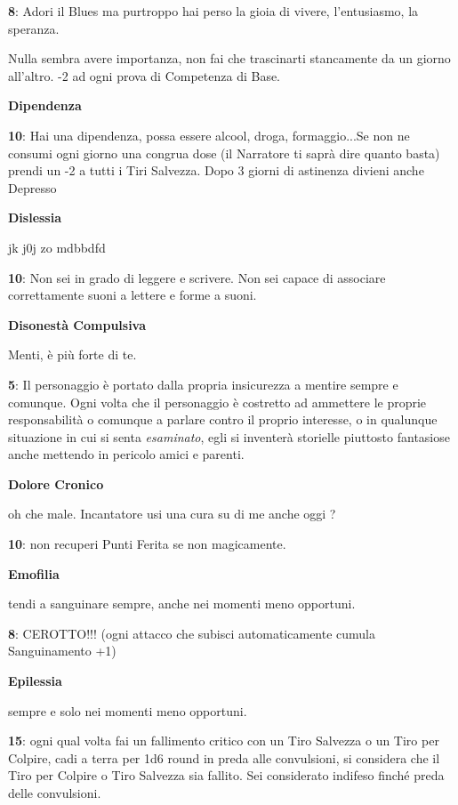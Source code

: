 \documentclass[a4paper,twoside,openany]{book}
\begin{document}
\begin{multicols}{2}
\textbf{8}: Adori il Blues ma purtroppo hai perso la gioia di vivere, l'entusiasmo, la speranza.

Nulla sembra avere importanza, non fai che trascinarti stancamente da un giorno all'altro. -2 ad ogni prova di Competenza di Base.

\textbf{Dipendenza}

\textbf{10}: Hai una dipendenza, possa essere alcool, droga, formaggio...Se non ne consumi ogni giorno una congrua dose (il Narratore ti saprà dire quanto basta) prendi un -2 a tutti i Tiri Salvezza. Dopo 3 giorni di astinenza divieni anche Depresso

\textbf{Dislessia}

jk j0j zo mdbbdfd

\textbf{10}: Non sei in grado di leggere e scrivere. Non sei capace di associare correttamente suoni a lettere e forme a suoni.

\textbf{Disonestà Compulsiva}

Menti, è più forte di te.

\textbf{5}: Il personaggio è portato dalla propria insicurezza a mentire sempre e comunque. Ogni volta che il personaggio è costretto ad ammettere le proprie responsabilità o comunque a parlare contro il proprio interesse, o in qualunque situazione in cui si senta \emph{esaminato}, egli si inventerà storielle piuttosto fantasiose anche mettendo in pericolo amici e parenti.

\textbf{Dolore Cronico}

oh che male. Incantatore usi una cura su di me anche oggi ?

\textbf{10}: non recuperi Punti Ferita se non magicamente.

\textbf{Emofilia}

tendi a sanguinare sempre, anche nei momenti meno opportuni.

\textbf{8}: CEROTTO!!! (ogni attacco che subisci automaticamente cumula Sanguinamento +1)

\textbf{Epilessia}

sempre e solo nei momenti meno opportuni.

\textbf{15}: ogni qual volta fai un fallimento critico con un Tiro Salvezza o un Tiro per Colpire, cadi a terra per 1d6 round in preda alle convulsioni, si considera che il Tiro per Colpire o Tiro Salvezza sia fallito. Sei considerato indifeso finché preda delle convulsioni.


\end{multicols}
\end{document}
